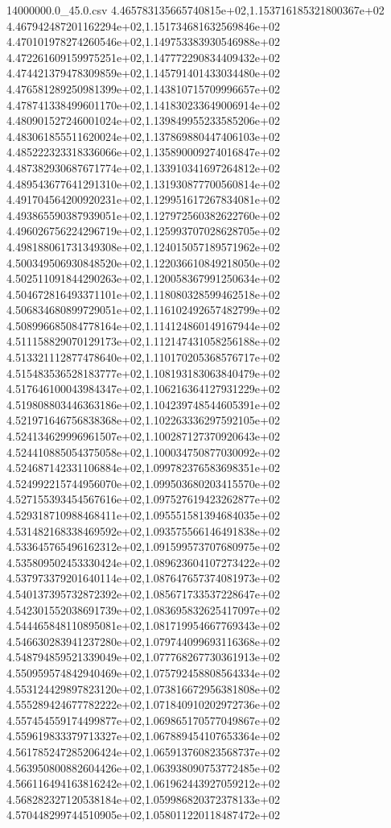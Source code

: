 \begin{filecontents*}{14000000.0_45.0.csv}
4.465783135665740815e+02,1.153716185321800367e+02
4.467942487201162294e+02,1.151734681632569846e+02
4.470101978274260546e+02,1.149753383930546988e+02
4.472261609159975251e+02,1.147772290834409432e+02
4.474421379478309859e+02,1.145791401433034480e+02
4.476581289250981399e+02,1.143810715709996657e+02
4.478741338499601170e+02,1.141830233649006914e+02
4.480901527246001024e+02,1.139849955233585206e+02
4.483061855511620024e+02,1.137869880447406103e+02
4.485222323318336066e+02,1.135890009274016847e+02
4.487382930687671774e+02,1.133910341697264812e+02
4.489543677641291310e+02,1.131930877700560814e+02
4.491704564200920231e+02,1.129951617267834081e+02
4.493865590387939051e+02,1.127972560382622760e+02
4.496026756224296719e+02,1.125993707028628705e+02
4.498188061731349308e+02,1.124015057189571962e+02
4.500349506930848520e+02,1.122036610849218050e+02
4.502511091844290263e+02,1.120058367991250634e+02
4.504672816493371101e+02,1.118080328599462518e+02
4.506834680899729051e+02,1.116102492657482799e+02
4.508996685084778164e+02,1.114124860149167944e+02
4.511158829070129173e+02,1.112147431058256188e+02
4.513321112877478640e+02,1.110170205368576717e+02
4.515483536528183777e+02,1.108193183063840479e+02
4.517646100043984347e+02,1.106216364127931229e+02
4.519808803446363186e+02,1.104239748544605391e+02
4.521971646756838368e+02,1.102263336297592105e+02
4.524134629996961507e+02,1.100287127370920643e+02
4.524410885054375058e+02,1.100034750877030092e+02
4.524687142331106884e+02,1.099782376583698351e+02
4.524992215744956070e+02,1.099503680203415570e+02
4.527155393454567616e+02,1.097527619423262877e+02
4.529318710988468411e+02,1.095551581394684035e+02
4.531482168338469592e+02,1.093575566146491838e+02
4.533645765496162312e+02,1.091599573707680975e+02
4.535809502453330424e+02,1.089623604107273422e+02
4.537973379201640114e+02,1.087647657374081973e+02
4.540137395732872392e+02,1.085671733537228647e+02
4.542301552038691739e+02,1.083695832625417097e+02
4.544465848110895081e+02,1.081719954667769343e+02
4.546630283941237280e+02,1.079744099693116368e+02
4.548794859521339049e+02,1.077768267730361913e+02
4.550959574842940469e+02,1.075792458808564334e+02
4.553124429897823120e+02,1.073816672956381808e+02
4.555289424677782222e+02,1.071840910202972736e+02
4.557454559174499877e+02,1.069865170577049867e+02
4.559619833379713327e+02,1.067889454107653364e+02
4.561785247285206424e+02,1.065913760823568737e+02
4.563950800882604426e+02,1.063938090753772485e+02
4.566116494163816242e+02,1.061962443927059212e+02
4.568282327120538184e+02,1.059986820372378133e+02
4.570448299744510905e+02,1.058011220118487472e+02

\end{filecontents*}
